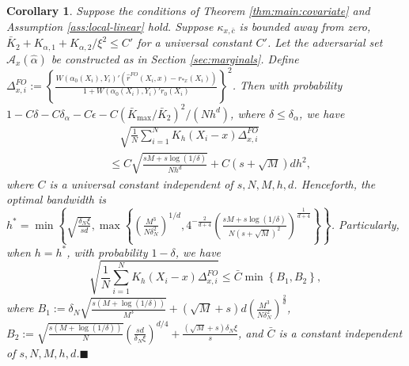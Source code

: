 \documentclass[11pt]{article}
\newtheorem{corollary}{Corollary}
\newcommand{\proofend}{\hfill$\blacksquare$}
\begin{document}
\begin{corollary}\label{cor:FO:covariate}
Suppose the conditions of Theorem \ref{thm:main:covariate} and  Assumption \ref{ass:local-linear} hold. Suppose $\kappa_{x,\bar{c}}$ is bounded away from zero,  $\bar{K}_2 + K_{\alpha,1} + K_{\alpha,2}/\xi^2 \leq C'$ for a universal constant $C'$. Let the adversarial set $\mathcal{A}_x(\hat{\alpha})$ be constructed as in Section \ref{sec:marginals}. Define $\displaystyle\Delta_{x,i}^{FO}:=\left\{\frac{W(\alpha_0(X_i),Y_i)'(\hat r^{FO}(X_i,x) - r_{*x}(X_i))}{1+W(\alpha_0(X_i),Y_i)'r_0(X_i)}\right\}^2$. Then with probability $1-C\delta-C\delta_\alpha-C\epsilon-C(\bar{K}_{\max}/\bar{K}_2)^2/(Nh^d)$, where $\delta\leq\delta_{\alpha}$, we have
\begin{equation}\label{eq:cor:cov:bound-1}
\begin{array}{rl}
&\displaystyle\quad\sqrt{\frac{1}{N}\sum_{i=1}^N K_h(X_i-x)\Delta_{x,i}^{FO}}\\
&\displaystyle\leq C\sqrt{\frac{sM+s\log(1/\delta)}{Nh^d}}+C(s+\sqrt{M})dh^2,
\end{array}
\end{equation}
where $C$ is a universal constant independent of $s,N,M,h,d$. Henceforth, the optimal bandwidth is $h^*=\min\left\{\sqrt{\frac{\delta_N\xi}{sd}},\max\left\{\left(\frac{M^3}{N\delta_N^2}\right)^{1/d},4^{-\frac{2}{d+4}}\left(\frac{sM+s\log(1/\delta)}{N(s+\sqrt{M})^2}\right)^{\frac{1}{d+4}}\right\}\right\}$.
Particularly, when $h=h^*$, with probability $1-\delta$, we have 
\begin{equation}\label{eq:bound:optimal-choice-h}
\sqrt{\frac{1}{N}\sum_{i=1}^N K_h(X_i-x)\Delta_{x,i}^{FO}}\leq\bar{C}\min\left\{B_{1},B_2\right\},
\end{equation}
where $B_1:=\delta_N\sqrt{\frac{s(M+\log(1/\delta))}{M^3}}+(\sqrt{M}+s)d\left(\frac{M^3}{N\delta_N^2}\right)^{\frac{2}{d}}$,
$B_2:=\sqrt{\frac{s(M+\log(1/\delta))}{N}}\left(\frac{sd}{\delta_N\xi}\right)^{d/4}\!\!+\frac{(\sqrt{M}+s)\delta_N\xi}{s}$, and $\bar{C}$ is a constant independent of $s,N,M,h,d$.\proofend
\end{corollary}
\end{document}
